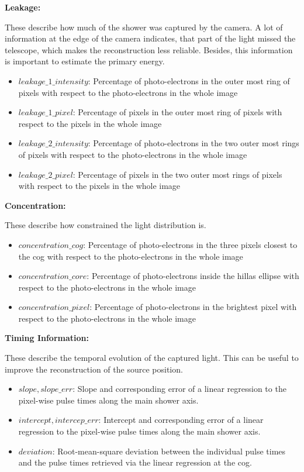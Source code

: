 \textbf{Leakage:}

These describe how much of the shower was captured by the camera.
A lot of information at the edge of the camera indicates, that part of the light missed the telescope, 
which makes the reconstruction less reliable.
Besides, this information is important to estimate the primary energy.

\begin{itemize}
    \item{$leakage\_1\_intensity$: Percentage of photo-electrons in the outer most ring of pixels with respect to the photo-electrons in the whole image}
    \item{$leakage\_1\_pixel$: Percentage of pixels in the outer most ring of pixels with respect to the pixels in the whole image}
    \item{$leakage\_2\_intensity$: Percentage of photo-electrons in the two outer most rings of pixels with respect to the photo-electrons in the whole image}
    \item{$leakage\_2\_pixel$: Percentage of pixels in the two outer most rings of pixels with respect to the pixels in the whole image}
\end{itemize}

\textbf{Concentration:}

These describe how constrained the light distribution is.
\begin{itemize}
    \item{$concentration\_cog$: Percentage of photo-electrons in the three pixels closest to the cog with respect to the photo-electrons in the whole image}
    \item{$concentration\_core$: Percentage of photo-electrons inside the hillas ellipse with respect to the photo-electrons in the whole image}
    \item{$concentration\_pixel$: Percentage of photo-electrons in the brightest pixel with respect to the photo-electrons in the whole image}
\end{itemize}

\textbf{Timing Information:}

These describe the temporal evolution of the captured light.
This can be useful to improve the reconstruction of the source position.
\begin{itemize}
    \item{$slope, slope\_err$: Slope and corresponding  error of a linear regression to the pixel-wise pulse times along the main shower axis.}
    \item{$intercept, intercep\_err$: Intercept and corresponding  error of a linear regression to the pixel-wise pulse times along the main shower axis.}
    \item{$deviation$: Root-mean-square deviation between the individual pulse times and the pulse times
        retrieved via the linear regression at the cog.}
\end{itemize}

